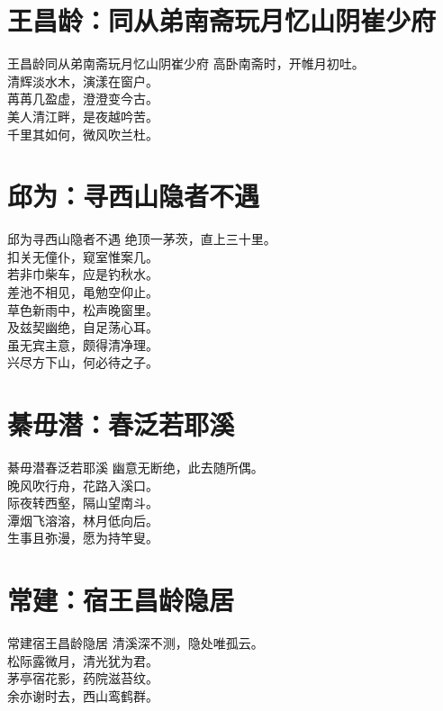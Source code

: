 \documentclass[12pt,oneside,a5paper]{book}
\begin{document}
\chapter{王昌龄：同从弟南斋玩月忆山阴崔少府}
\begin{poemzh}{王昌龄}{同从弟南斋玩月忆山阴崔少府}
高卧南斋时，开帷月初吐。\\
清辉淡水木，演漾在窗户。\\
苒苒几盈虚，澄澄变今古。\\
美人清江畔，是夜越吟苦。\\
千里其如何，微风吹兰杜。\\ 
\end{poemzh}

\chapter{邱为：寻西山隐者不遇}
\begin{poemzh}{邱为}{寻西山隐者不遇}
绝顶一茅茨，直上三十里。\\
扣关无僮仆，窥室惟案几。\\
若非巾柴车，应是钓秋水。\\
差池不相见，黾勉空仰止。\\
草色新雨中，松声晚窗里。\\
及兹契幽绝，自足荡心耳。\\
虽无宾主意，颇得清净理。\\
兴尽方下山，何必待之子。\\ 
\end{poemzh}

\chapter{綦毋潜：春泛若耶溪}
\begin{poemzh}{綦毋潜}{春泛若耶溪}
幽意无断绝，此去随所偶。\\
晚风吹行舟，花路入溪口。\\
际夜转西壑，隔山望南斗。\\
潭烟飞溶溶，林月低向后。\\
生事且弥漫，愿为持竿叟。\\ 
\end{poemzh}

\chapter{常建：宿王昌龄隐居}
\begin{poemzh}{常建}{宿王昌龄隐居}
清溪深不测，隐处唯孤云。\\
松际露微月，清光犹为君。\\
茅亭宿花影，药院滋苔纹。\\
余亦谢时去，西山鸾鹤群。\\ 
\end{poemzh}
\end{document}

